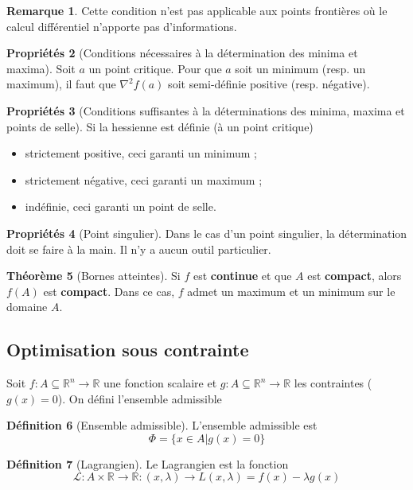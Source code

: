 \documentclass[11pt,a4paper]{article}
\theoremstyle{definition}
\newtheorem{mydef}{Définition}%
\newtheorem{myprop}[mydef]{Propriétés}
\newtheorem{myrem}[mydef]{Remarque}
\newtheorem{mytheo}[mydef]{Théorème}
\newcommand{\R}{\mathbb{R}}
\begin{document}
\begin{myrem}
	Cette condition n'est pas applicable aux points frontières où le calcul différentiel n'apporte pas d'informations.
\end{myrem}

\begin{myprop}[Conditions nécessaires à la détermination des minima et maxima]
	Soit $a$ un point critique. Pour que $a$ soit un minimum (resp. un maximum), il faut que $\nabla^2 f(a)$ soit semi-définie positive (resp. négative).
\end{myprop}

\begin{myprop}[Conditions suffisantes à la déterminations des minima, maxima et points de selle]
	Si la hessienne est définie (à un point critique)
	\begin{itemize}
		\item strictement positive, ceci garanti un minimum ;
		\item strictement négative, ceci garanti un maximum ;
		\item indéfinie, ceci garanti un point de selle.
	\end{itemize}
\end{myprop}

\begin{myprop}[Point singulier]
	Dans le cas d'un point singulier, la détermination doit se faire à la main. Il n'y a aucun outil particulier.
\end{myprop}

\begin{mytheo}[Bornes atteintes]
	Si $f$ est \textbf{continue} et que $A$ est \textbf{compact}, alors $f(A)$ est \textbf{compact}. Dans ce cas, $f$ admet un maximum et un minimum sur le domaine $A$.
\end{mytheo}

\subsection{Optimisation sous contrainte}

Soit $f : A \subseteq \R^n \to \R$ une fonction scalaire et $g : A \subseteq \R^n \to \R$ les contraintes ($g(x) = 0$). On défini l'ensemble admissible

\begin{mydef}[Ensemble admissible] L'ensemble admissible est
	\[ \Phi = \{ x \in A | g(x) = 0 \} \]
\end{mydef}

\begin{mydef}[Lagrangien] Le Lagrangien est la fonction
	\[ \mathcal{L} : A \times \R \to \R : (x, \lambda) \to L(x, \lambda) = f(x) - \lambda g(x) \]
\end{mydef}
\end{document}
